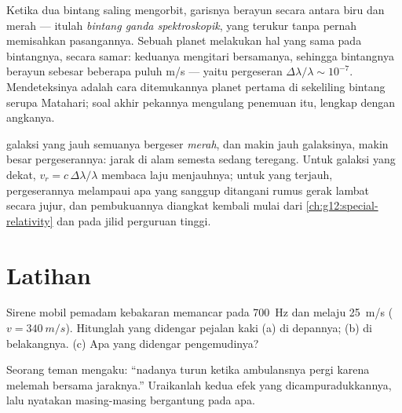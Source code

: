 \begin{example}\label{ex:g12:doppler-effect:wobble}
Ketika dua bintang saling mengorbit, garisnya berayun secara  antara biru dan merah
--- itulah \emph{bintang ganda spektroskopik}, yang
 terukur tanpa pernah memisahkan pasangannya. Sebuah planet melakukan hal yang
sama pada bintangnya, secara samar: keduanya mengitari  bersamanya, sehingga
 bintangnya berayun sebesar beberapa puluh \unit{m/s} --- yaitu pergeseran
$\Delta\lambda/\lambda \sim 10^{-7}$. Mendeteksinya adalah cara ditemukannya planet pertama
di sekeliling bintang serupa Matahari; soal akhir pekannya mengulang penemuan itu, lengkap
dengan angkanya.
\end{example}

\begin{remark}\label{rem:g12:doppler-effect:expansion}
 galaksi yang jauh semuanya bergeser \emph{merah}, dan makin jauh galaksinya, makin
besar pergeserannya: jarak di alam semesta sedang teregang. Untuk galaksi yang dekat,
$v_r = c\,\Delta\lambda/\lambda$ membaca laju menjauhnya; untuk yang terjauh,
pergeserannya melampaui apa yang sanggup ditangani rumus gerak lambat secara jujur, dan
pembukuannya diangkat kembali mulai dari \cref{ch:g12:special-relativity} dan pada jilid
perguruan tinggi.
\end{remark}

\section{Latihan}

\begin{exercise}[$\star$]\label{exo:g12:doppler-effect:1}
Sirene mobil pemadam kebakaran memancar pada \qty{700}{Hz} dan melaju \qty{25}{m/s}
($v = \qty{340}{m/s}$). Hitunglah  yang didengar pejalan kaki (a) di depannya;
(b) di belakangnya. (c) Apa yang didengar pengemudinya?
\end{exercise}

\begin{exercise}[$\star$]\label{exo:g12:doppler-effect:2}
Seorang teman mengaku: ``nadanya turun ketika ambulansnya pergi karena  melemah
bersama jaraknya.'' Uraikanlah kedua efek yang dicampuradukkannya, lalu nyatakan
masing-masing bergantung pada apa.
\end{exercise}

